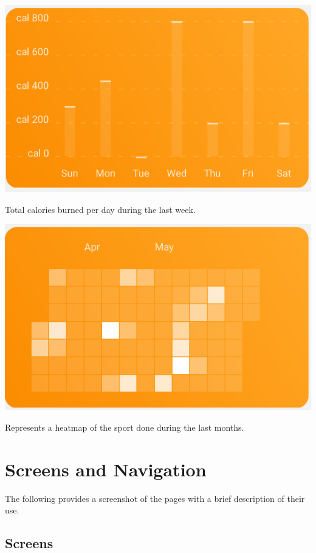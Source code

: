 \documentclass[12pt,hidelinks]{article}
\begin{document}
	\begin{center}
		\includegraphics[scale=1]{screenshotA}
	\end{center}

    Total calories burned per day during the last week.
	\begin{center}
		\includegraphics[scale=1]{screenshotB}
	\end{center}
	Represents a heatmap of the sport done during the last months.
	

\newpage
\section{Screens and Navigation}
\vspace{10.5cm}
The following provides a screenshot of the pages with a brief description of their use.
	\subsection{Screens}
\end{document}
